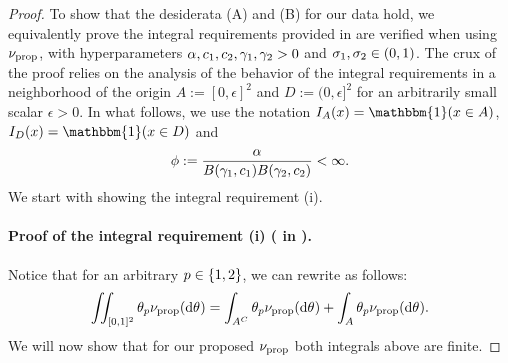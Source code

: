 \begin{proof} \label{proof:proper}
    To show that the desiderata (A) and (B) for our data hold, we equivalently prove the integral requirements provided in  are verified when using $\nu_{\mathrm{prop}}$, with hyperparameters $\alpha,c_{1},c_{2}, \gamma_{1},\gamma_{2}>0$ and $\sigma_{1},\sigma_{2}\in (0,1)$.
    The crux of the proof relies on the analysis of the behavior of the integral requirements in a neighborhood of the origin  $A:=[0,\epsilon]^2$ and $D:=(0,\epsilon]^2$ for an arbitrarily small scalar $\epsilon > 0$. 
    In what follows, we use the notation $I_A(x) = \mathbbm{1}(x \in A)$, $I_{D}(x)=\mathbbm{1}(x \in D)$ and
    \[
    	\phi:=\frac{\alpha}{B(\gamma_{1},c_{1})B(\gamma_{2},c_{2})}<\infty.
    \]
    We start with showing the integral requirement (i).
    \paragraph{Proof of the integral requirement (i) ( in ).}
    Notice that for an arbitrary $p \in \{1,2\}$, we can rewrite  as follows:
    	\begin{equation*}
    		\iint_{[0,1]^2}\variantfreqperpop{\popidx}\ratemeasproposed(\de \vecvariantfreq{} )= \int_{A^C}\variantfreqperpop{\popidx}\ratemeasproposed(\de\vecvariantfreq{}) + \int_A \variantfreqperpop{\popidx}\ratemeasproposed(\de\vecvariantfreq{}).
	\end{equation*}
	We will now show that for our proposed $\nu_{\mathrm{prop}}$ both integrals above are finite.


\end{proof}
